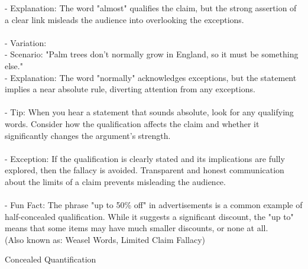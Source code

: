 \documentclass[a4paper,12pt,single,pdftex]{scrartcl}
\begin{document}
{    
        - Explanation: The word "almost" qualifies the claim, but the strong assertion of a clear link misleads the audience into overlooking the exceptions.
    \\

    
      
    \\

    
      - Variation:
    \\

    
        - Scenario: "Palm trees don’t normally grow in England, so it must be something else."
    \\

    
        - Explanation: The word "normally" acknowledges exceptions, but the statement implies a near absolute rule, diverting attention from any exceptions.
    \\

    
      
    \\

    
      - Tip: When you hear a statement that sounds absolute, look for any qualifying words. Consider how the qualification affects the claim and whether it significantly changes the argument's strength.
    \\

    
      
    \\

    
      - Exception: If the qualification is clearly stated and its implications are fully explored, then the fallacy is avoided. Transparent and honest communication about the limits of a claim prevents misleading the audience.
    \\

    
      
    \\

    
      - Fun Fact: The phrase "up to 50\% off" in advertisements is a common example of half-concealed qualification. While it suggests a significant discount, the "up to" means that some items may have much smaller discounts, or none at all.
    \\

  
    
      (Also known as: Weasel Words, Limited Claim Fallacy)
    \\

  }


Concealed Quantification
    
\end{document}
